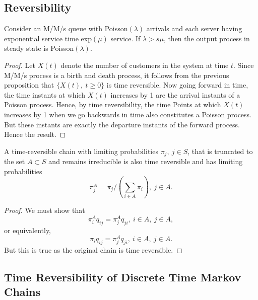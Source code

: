 \documentclass[a4paper,10pt,english]{article}
\begin{document}
\subsection{Reversibility}
\begin{cor}
Consider an M/M/s queue with Poisson$(\lambda)$ arrivals and each server having exponential service time exp$(\mu)$ service. If $\lambda > s \mu$, then the output process in steady state is Poisson$(\lambda)$.
\end{cor}
\begin{proof}
Let $X(t)$ denote the number of customers in the system at time $t$. Since M/M/s process is a birth and death process, it follows from the previous proposition that $\{X(t),~t \geq 0\}$ is time reversible. Now going forward in time, the time instants at which $X(t)$ increases by 1 are the arrival instants of a Poisson process. Hence, by time reversibility, the time Points at which $X(t)$ increases by 1 when we go backwards in time also constitutes a Poisson process. But these instants are exactly the departure instants of the forward process. Hence the result.
\end{proof}
\begin{prop}
A time-reversible chain with limiting probabilities $\pi_j,~ j \in S$, that is truncated to the set $A\subset S$ and remains irreducible is also time reversible and has limiting probabilities 
\begin{equation}
\pi_j^A=\pi_j/(\sum_{i \in A}\pi_i),~ j \in A.
\end{equation}
\end{prop}
\begin{proof}
We must show that 
\begin{equation*}
\pi_i^Aq_{ij}=\pi_j^Aq_{ji},~ i \in A,~ j \in A,
\end{equation*}
or equivalently,
\begin{equation*}
\pi_iq_{ij}=\pi_j^Aq_{ji},~ i \in A,~ j \in A.
\end{equation*}
But this is true as the original chain is time reversible.
\end{proof}


\subsection{Time Reversibility of Discrete Time Markov Chains}
\end{document}
